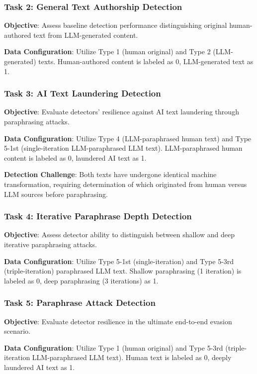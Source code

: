 \subsubsection{Task 2: General Text Authorship Detection}
\textbf{Objective}: Assess baseline detection performance distinguishing original human-authored text from LLM-generated content.

\textbf{Data Configuration}: Utilize Type 1 (human original) and Type 2 (LLM-generated) texts. Human-authored content is labeled as 0, LLM-generated text as 1.

\subsubsection{Task 3: AI Text Laundering Detection}
\textbf{Objective}: Evaluate detectors' resilience against AI text laundering through paraphrasing attacks.

\textbf{Data Configuration}: Utilize Type 4 (LLM-paraphrased human text) and Type 5-1st (single-iteration LLM-paraphrased LLM text). LLM-paraphrased human content is labeled as 0, laundered AI text as 1.

\textbf{Detection Challenge}: Both texts have undergone identical machine transformation, requiring determination of which originated from human versus LLM sources before paraphrasing.

\subsubsection{Task 4: Iterative Paraphrase Depth Detection}
\textbf{Objective}: Assess detector ability to distinguish between shallow and deep iterative paraphrasing attacks.

\textbf{Data Configuration}: Utilize Type 5-1st (single-iteration) and Type 5-3rd (triple-iteration) paraphrased LLM text. Shallow paraphrasing (1 iteration) is labeled as 0, deep paraphrasing (3 iterations) as 1.

\subsubsection{Task 5: Paraphrase Attack Detection}
\textbf{Objective}: Evaluate detector resilience in the ultimate end-to-end evasion scenario.

\textbf{Data Configuration}: Utilize Type 1 (human original) and Type 5-3rd (triple-iteration LLM-paraphrased LLM text). Human text is labeled as 0, deeply laundered AI text as 1.

